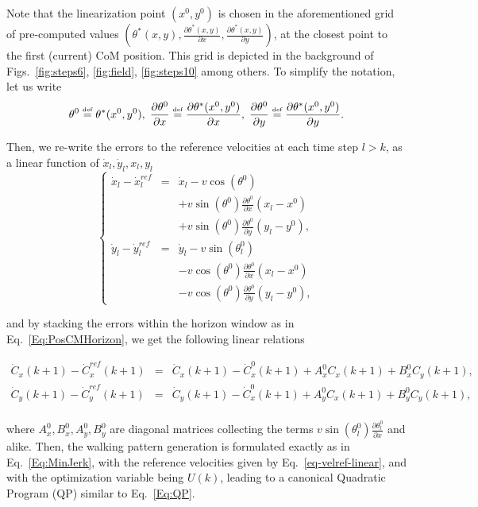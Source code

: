 Note that the linearization point $(x^0,y^0)$ is chosen in the aforementioned grid of pre-computed values $(\theta^*(x,y),\frac{\partial \theta^*(x,y)}{\partial x},  \frac{\partial \theta^*(x,y)}{\partial y})$, at the closest point to the first (current) CoM position. This grid is depicted in the background of Figs.~\ref{fig:steps6}, \ref{fig:field}, \ref{fig:steps10} among others. To simplify the notation, let us write
$$
\theta^0 \stackrel{\mbox{\tiny def}}{=}  \theta^*(x^0,y^0),\;
\frac{\partial \theta^0}{\partial x} \stackrel{\mbox{\tiny def}}{=} \frac{\partial \theta^*(x^0,y^0)}{\partial x},\;
\frac{\partial \theta^0}{\partial y} \stackrel{\mbox{\tiny def}}{=}  \frac{\partial \theta^*(x^0,y^0)}{\partial y}. 
$$


Then, we re-write the errors to the reference velocities at each time step $l>k$, as a linear function of $\dot{x}_l,\dot{y}_l,x_l,y_l$
$$
\left\{
\begin{array}{ccc}
\dot{x}_l-\dot{x}^{ref}_l & = & \dot{x}_l - v\cos(\theta^0)\\
&& + v\sin(\theta^0) \frac{\partial \theta^0}{\partial x}  (x_l-x^0)\\
&& + v\sin(\theta^0) \frac{\partial \theta^0}{\partial y}  (y_l-y^0),\\
\dot{y}_l-\dot{y}^{ref}_l & = & \dot{y}_l - v\sin(\theta^0_l)\\
&& - v\cos(\theta^0) \frac{\partial \theta^0}{\partial x}  (x_l-x^0)\\
&& - v\cos(\theta^0) \frac{\partial \theta^0}{\partial y}  (y_l-y^0),
\end{array}
\right.
$$ 

and by stacking the errors within the horizon window as in Eq.~\ref{Eq:PosCMHorizon}, we get the following 
linear relations

{\small
\begin{eqnarray}
\nonumber
 \dot{C}_x(k+1)  - \dot{C}_x^{ref}(k+1) & = &    \dot{C}_{x}(k+1) -   \dot{C}^{0}_x(k+1)  + A^0_{x} C_{x}(k+1)  + B_x^{0} C_{y}(k+1),\\
\nonumber
 \dot{C}_{y}(k+1) - \dot{C}_y^{ref}(k+1) & = &   \dot{C}_{y}(k+1) - \dot{C}^0_x(k+1) + A^0_{y} C_{x}(k+1) + B^0_{y}  C_y(k+1),\\
 \label{eq-velref-linear}
 \end{eqnarray}
}

where $A^0_{x},B^0_{x},A^0_{y},B^0_{y}$ are diagonal matrices collecting the terms $v\sin(\theta^0_l) \frac{\partial \theta^0_l}{\partial x}$ and alike. Then, the walking pattern generation is formulated exactly as in Eq.~\ref{Eq:MinJerk}, with the reference velocities given by Eq.~\ref{eq-velref-linear}, and with the optimization variable being $U(k)$,
leading to a canonical Quadratic Program (QP) similar to Eq.~\ref{Eq:QP}.

